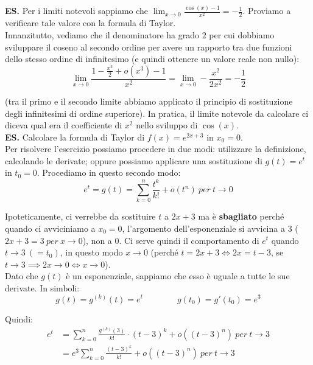 \documentclass{article}
\begin{document}
\noindent\textbf{ES.} Per i limiti notevoli sappiamo che $\lim_{x \to 0} \frac{\cos(x) - 1}{x^2} = - \frac{1}{2}$. Proviamo a verificare tale valore con la formula di Taylor. \\
Innanzitutto, vediamo che il denominatore ha grado $2$ per cui dobbiamo sviluppare il coseno al secondo ordine per avere un rapporto tra due funzioni dello stesso ordine di infinitesimo (e quindi ottenere un valore reale non nullo):
\begin{equation*}
    \lim_{x \to 0} \frac{1 - \frac{x^2}{2} + o(x^3) - 1}{x^2} = \lim_{x \to 0} - \frac{x^2}{2x^2} = -\frac{1}{2}
\end{equation*}

\noindent (tra il primo e il secondo limite abbiamo applicato il principio di sostituzione degli infinitesimi di ordine superiore). In pratica, il limite notevole da calcolare ci diceva qual era il coefficiente di $x^2$ nello sviluppo di $\cos(x)$.\\

\noindent\textbf{ES.} Calcolare la formula di Taylor di $f(x) = e^{2x + 3}$ in $x_0 = 0$.\\
Per risolvere l'esercizio possiamo procedere in due modi: utilizzare la definizione, calcolando le derivate; oppure possiamo applicare una sostituzione di $g(t) = e^t$ in $t_0 = 0$. Procediamo in questo secondo modo:
\begin{equation*}
    e^t = g(t) = \sum_{k = 0}^n \frac{t^k}{k!} + o(t^n) \ per \ t \to 0
\end{equation*}

\noindent Ipoteticamente, ci verrebbe da sostituire $t$ a $2x + 3$ ma è \textbf{sbagliato} perché quando ci avviciniamo a $x_0 = 0$, l'argomento dell'esponenziale si avvicina a $3$ ($2x + 3 = 3 \ per \ x \to 0$), non a $0$. Ci serve quindi il comportamento di $e^t$ quando $t \to 3 \ (= t_0)$, in questo modo $x \to 0$ (perché $t = 2x + 3 \iff 2x = t - 3$, se $t \to 3 \implies 2x \to 0 \iff x \to 0$). \\
Dato che $g(t)$ è un esponenziale, sappiamo che esso è uguale a tutte le sue derivate. In simboli:
\begin{equation*}
    g(t) = g^{(k)}(t) = e^t \qquad \qquad g(t_0) = g'(t_0) = e^3
\end{equation*}

\noindent Quindi:
\begin{align*}
    e^t &= \sum_{k = 0}^n \frac{g^{(k)}(3)}{k!} \cdot (t - 3)^k + o((t - 3)^n) \ per \ t \to 3 \\
    &= e^3 \sum_{k = 0}^n \frac{(t - 3)^k}{k!} + o((t - 3)^n) \ per \ t \to 3
\end{align*}
\end{document}
